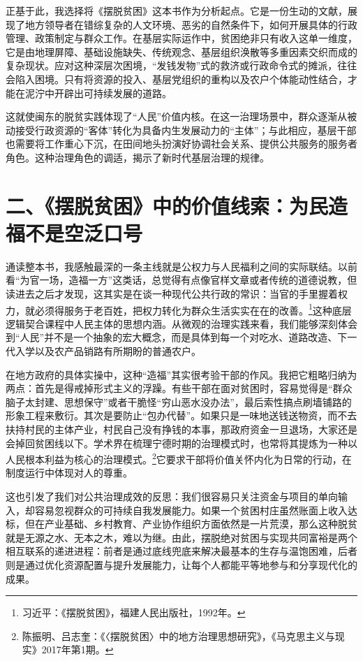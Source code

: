 \documentclass[12pt,a4paper]{ctexart}
\begin{document}
正基于此，我选择将《摆脱贫困》这本书作为分析起点。它是一份生动的文献，展现了地方领导者在错综复杂的人文环境、恶劣的自然条件下，如何开展具体的行政管理、政策制定与群众工作。在基层实际运作中，贫困绝非只有收入这单一维度，它是由地理屏障、基础设施缺失、传统观念、基层组织涣散等多重因素交织而成的复杂现状。应对这种深层次困境，“发钱发物”式的救济或行政命令式的摊派，往往会陷入困境。只有将资源的投入、基层党组织的重构以及农户个体能动性结合，才能在泥泞中开辟出可持续发展的道路。

这就使闽东的脱贫实践体现了“人民”价值内核。在这一治理场景中，群众逐渐从被动接受行政资源的“客体”转化为具备内生发展动力的“主体”；与此相应，基层干部也需要将工作重心下沉，在田间地头扮演好协调社会关系、提供公共服务的服务者角色。这种治理角色的调适，揭示了新时代基层治理的规律。

\section*{二、《摆脱贫困》中的价值线索：为民造福不是空泛口号}

通读整本书，我感触最深的一条主线就是公权力与人民福利之间的实际联结。以前看“为官一场，造福一方”这类话，总觉得有点像官样文章或者传统的道德说教，但读进去之后才发现，这其实是在谈一种现代公共行政的常识：当官的手里握着权力，就必须得服务于老百姓，把权力转化为群众生活实实在在的改善。\footnote{习近平：《摆脱贫困》，福建人民出版社，1992年。}这种底层逻辑契合课程中人民主体的思想内涵。从微观的治理实践来看，我们能够深刻体会到“人民”并不是一个抽象的宏大概念，而是具体到每一个对吃水、道路改造、下一代入学以及农产品销路有所期盼的普通农户。

在地方政府的具体实操中，这种“造福”其实很考验干部的作风。我把它粗略归纳为两点：首先是得戒掉形式主义的浮躁。有些干部在面对贫困时，容易觉得是“群众脑子太封建、思想保守”或者干脆怪“穷山恶水没办法”，最后索性搞点刷墙铺路的形象工程来敷衍。其次是要防止“包办代替”。如果只是一味地送钱送物资，而不去扶持村民的主体产业，村民自己没有挣钱的本事，那政府资金一旦退场，大家还是会掉回贫困线以下。学术界在梳理宁德时期的治理模式时，也常将其提炼为一种以人民根本利益为核心的治理模式。\footnote{陈振明、吕志奎：《〈摆脱贫困〉中的地方治理思想研究》，《马克思主义与现实》2017年第1期。}它要求干部将价值关怀内化为日常的行动，在制度运行中体现对人的尊重。

这也引发了我们对公共治理成效的反思：我们很容易只关注资金与项目的单向输入，却容易忽视群众的可持续自我发展能力。如果一个贫困村庄虽然账面上收入达标，但在产业基础、乡村教育、产业协作组织方面依然是一片荒漠，那么这种脱贫就是无源之水、无本之木，难以为继。由此，摆脱绝对贫困与实现共同富裕是两个相互联系的递进进程：前者是通过底线兜底来解决最基本的生存与温饱困难，后者则是通过优化资源配置与提升发展能力，让每个人都能平等地参与和分享现代化的成果。
\end{document}

